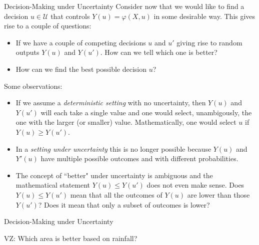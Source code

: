 \documentclass[9pt]{beamer}
\begin{document}
%
\begin{frame}{Decision-Making under Uncertainty}
Consider now that we would like to find a decision $u\in \mathcal{U}$ that controls $Y(u)=\varphi(X,u)$ in some desirable way. This gives rise to a couple of questions:
\begin{block}{}
\begin{itemize}
\item If we have a couple of competing decisions $u$ and $u'$ giving rise to random outputs $Y(u)$ and $Y(u')$. How can we tell which one is better? 

\item How can we find the best possible decision $u$?
\end{itemize}
\end{block}
Some observations: 
\begin{itemize}
\item If we assume a {\em deterministic setting} with no uncertainty, then $Y(u)$ and $Y(u')$ will each take a single value and one would select, unambigously,  the one with the larger (or smaller) value. Mathematically, one would select $u$ if $Y(u)\geq Y(u')$.   

\item In a {\em setting under uncertainty} this is no longer possible because $Y(u)$ and $Y'(u)$ have multiple possible outcomes and with different probabilities. 

\item The concept of ``better" under uncertainty is ambiguous and the mathematical statement $Y(u)\leq Y(u')$ does not even make sense. Does $Y(u)\leq Y(u')$ mean that all the outcomes of $Y(u)$ are lower than those $Y(u')$? Does it mean that only a subset of outcomes is lower? 
\end{itemize}

\end{frame}

%
\begin{frame}{Decision-Making under Uncertainty}
\begin{block}{}
{\color{red} VZ: Which area is better based on rainfall?}
\end{block}
\end{frame}
\end{document}
